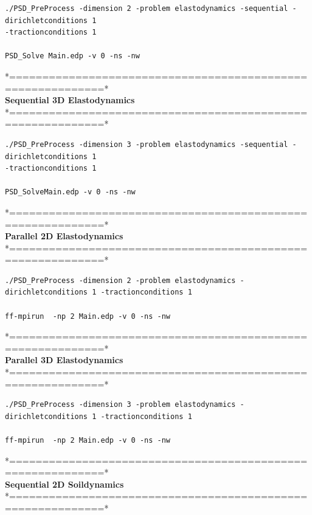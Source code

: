 \documentclass{report}
\begin{document}
\begin{lstlisting}[style=Linux]
./PSD_PreProcess -dimension 2 -problem elastodynamics -sequential -dirichletconditions 1  
-tractionconditions 1 

PSD_Solve Main.edp -v 0 -ns -nw
\end{lstlisting}
*============================================================*\\
\textbf{ Sequential 3D Elastodynamics}  \\                    
*============================================================*\\

\begin{lstlisting}[style=Linux]
./PSD_PreProcess -dimension 3 -problem elastodynamics -sequential -dirichletconditions 1 
-tractionconditions 1 

PSD_SolveMain.edp -v 0 -ns -nw
\end{lstlisting}
*============================================================*\\
\textbf{ Parallel 2D Elastodynamics}   \\                   
*============================================================*\\

\begin{lstlisting}[style=Linux]
./PSD_PreProcess -dimension 2 -problem elastodynamics -dirichletconditions 1 -tractionconditions 1 

ff-mpirun  -np 2 Main.edp -v 0 -ns -nw
\end{lstlisting}
*============================================================*\\
\textbf{ Parallel 3D Elastodynamics } \\                    
*============================================================*\\

\begin{lstlisting}[style=Linux]
./PSD_PreProcess -dimension 3 -problem elastodynamics -dirichletconditions 1 -tractionconditions 1 

ff-mpirun  -np 2 Main.edp -v 0 -ns -nw
\end{lstlisting}
*============================================================*\\
\textbf{ Sequential 2D Soildynamics }    \\                   
*============================================================*\\
\end{document}

